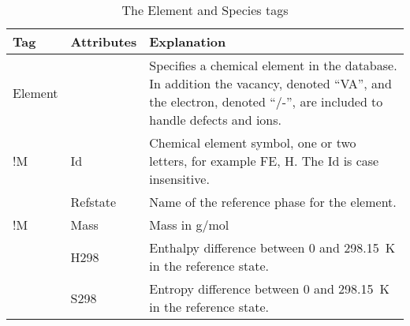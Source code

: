 \documentclass[10pt]{article}
\begin{document}


\begin{table}[!h]
  \caption{The Element and Species tags}\label{sc:xtdbelements}
\begin{tabular}{|p{} p{} p{}|}\hline
  Tag & Attributes & Explanation\\\hline

  Element & & Specifies a chemical element in the database.  In addition
              the vacancy, denoted ``VA'', and the electron, denoted ``/-'',
              are included to handle defects and ions.\\
!M          & Id        &  Chemical element symbol, one or two letters, 
                         for example FE, H.  The Id is case insensitive.\\
          & Refstate  &  Name of the reference phase for the element.\\
!M          & Mass      &  Mass in g/mol\\
          & H298      &  Enthalpy difference between 0 and 298.15~K 
                         in the reference state.\\
          & S298      &  Entropy difference between 0 and 298.15~K in 
                         the reference state.\\\hline


\end{tabular}
\end{table}
\end{document}
